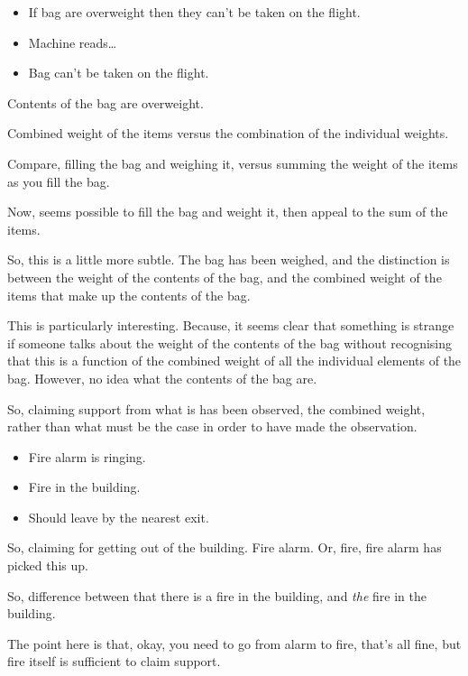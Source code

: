 \begin{note}

  \begin{illustration}
    \begin{itemize}
    \item If bag are overweight then they can't be taken on the flight.
    \item Machine reads\dots
    \item Bag can't be taken on the flight.
    \end{itemize}
  \end{illustration}
  Contents of the bag are overweight.

  Combined weight of the items versus the combination of the individual weights.

  Compare, filling the bag and weighing it, versus summing the weight of the items as you fill the bag.

  Now, seems possible to fill the bag and weight it, then appeal to the sum of the items.

  So, this is a little more subtle.
  The bag has been weighed, and the distinction is between the weight of the contents of the bag, and the combined weight of the items that make up the contents of the bag.

  This is particularly interesting.
  Because, it seems clear that something is strange if someone talks about the weight of the contents of the bag without recognising that this is a function of the combined weight of all the individual elements of the bag.
  However, no idea what the contents of the bag are.

  So, claiming support from what is has been observed, the combined weight, rather than what must be the case in order to have made the observation.
\end{note}

\begin{note}
  \begin{illustration}
    \begin{itemize}
    \item Fire alarm is ringing.
    \item Fire in the building.
    \item Should leave by the nearest exit.
    \end{itemize}
  \end{illustration}
  So, claiming for getting out of the building.
  Fire alarm.
  Or, fire, fire alarm has picked this up.

  So, difference between that there is a fire in the building, and \emph{the} fire in the building.

  The point here is that, okay, you need to go from alarm to fire, that's all fine, but fire itself is sufficient to claim support.
\end{note}

